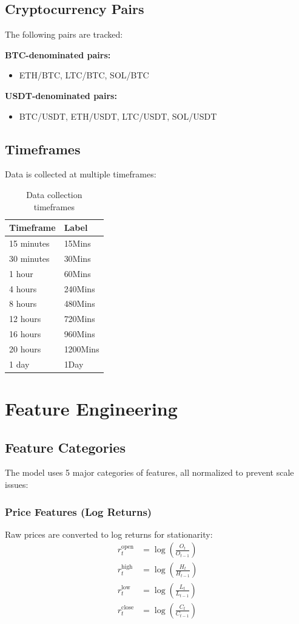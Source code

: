 \documentclass[12pt,a4paper]{article}
\begin{document}
\subsection{Cryptocurrency Pairs}
The following pairs are tracked:

\textbf{BTC-denominated pairs:}
\begin{itemize}
    \item ETH/BTC, LTC/BTC, SOL/BTC
\end{itemize}

\textbf{USDT-denominated pairs:}
\begin{itemize}
    \item BTC/USDT, ETH/USDT, LTC/USDT, SOL/USDT
\end{itemize}

\subsection{Timeframes}
Data is collected at multiple timeframes:
\begin{table}[H]
\centering
\begin{tabular}{ll}
\toprule
\textbf{Timeframe} & \textbf{Label} \\
\midrule
15 minutes & 15Mins \\
30 minutes & 30Mins \\
1 hour & 60Mins \\
4 hours & 240Mins \\
8 hours & 480Mins \\
12 hours & 720Mins \\
16 hours & 960Mins \\
20 hours & 1200Mins \\
1 day & 1Day \\
\bottomrule
\end{tabular}
\caption{Data collection timeframes}
\end{table}

\section{Feature Engineering}

\subsection{Feature Categories}
The model uses 5 major categories of features, all normalized to prevent scale issues:

\subsubsection{Price Features (Log Returns)}
Raw prices are converted to log returns for stationarity:
\begin{align}
    r_t^{\text{open}} &= \log\left(\frac{O_t}{O_{t-1}}\right) \\
    r_t^{\text{high}} &= \log\left(\frac{H_t}{H_{t-1}}\right) \\
    r_t^{\text{low}} &= \log\left(\frac{L_t}{L_{t-1}}\right) \\
    r_t^{\text{close}} &= \log\left(\frac{C_t}{C_{t-1}}\right)
\end{align}
\end{document}
